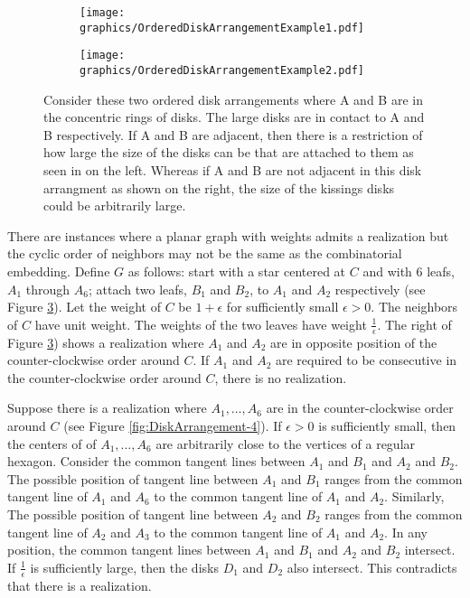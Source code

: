 \begin{figure}[!htbp]
\begin{center}
  \begin{subfigure}[b]{.48\textwidth}
  \begin{center}
	  \texttt{[image: graphics/OrderedDiskArrangementExample1.pdf]}
	  \label{fig:circlePacking3-1}
	  \end{center}
  \end{subfigure}
  \begin{subfigure}[b]{0.48\textwidth}
  \begin{center}
	  \texttt{[image: graphics/OrderedDiskArrangementExample2.pdf]}	  
	  \label{fig:circlePacking3-2}
	  \end{center}
  \end{subfigure}
  \caption{Consider these two ordered disk arrangements where A and B are in the concentric rings of disks.  The large disks are in contact to A and B respectively.  
  If A and B are adjacent, then there is a restriction of how large the size of the disks can be that are attached to them as seen in on the left.  
  Whereas if A and B are not adjacent in this disk arrangment as shown on the right, the size of the kissings disks could be arbitrarily large.}\label{fig:circlePacking-3}
\end{center} 
\end{figure}

There are instances where a planar graph with weights admits a realization but the cyclic order of neighbors may not be the same as the combinatorial embedding.
Define $G$ as follows: start with a star centered at $C$ and with 6 leafs, $A_1$ through $A_6$; attach two leafs, $B_1$ and $B_2$, to $A_1$ and  $A_2$ respectively (see  Figure \ref{fig:circlePacking-3}).
Let the weight of $C$ be $1+\epsilon$ for sufficiently small $\epsilon > 0$.
The neighbors of $C$ have unit weight.
The weights of the two leaves have weight $\frac{1}{\epsilon}$.  
The right of Figure \ref{fig:circlePacking-3}) shows a realization where $A_1$ and $A_2$ are in opposite position of the counter-clockwise order around $C$.
If $A_1$ and $A_2$ are required to be consecutive in the counter-clockwise order around $C$, there is no realization.

Suppose there is a realization where $A_1, \ldots, A_6$ are in the counter-clockwise order around $C$ (see Figure \ref{fig:DiskArrangement-4}).
If $\epsilon>0$ is sufficiently small, then the centers of of $A_1, \ldots, A_6$ are arbitrarily close to the vertices of a regular hexagon.
Consider the common tangent lines between $A_1$ and $B_1$ and $A_2$ and $B_2$.
The possible position of tangent line between $A_1$ and $B_1$ ranges from the common tangent line of $A_1$ and $A_6$ to the common tangent line of $A_1$ and $A_2$.
Similarly, The possible position of tangent line between $A_2$ and $B_2$ ranges from the common tangent line of $A_2$ and $A_3$ to the common tangent line of $A_1$ and $A_2$.
In any position, the common tangent lines between $A_1$ and $B_1$ and $A_2$ and $B_2$ intersect.
If $\frac{1}{\epsilon}$ is sufficiently large, then the disks $D_1$ and $D_2$ also intersect.
This contradicts that there is a realization.

